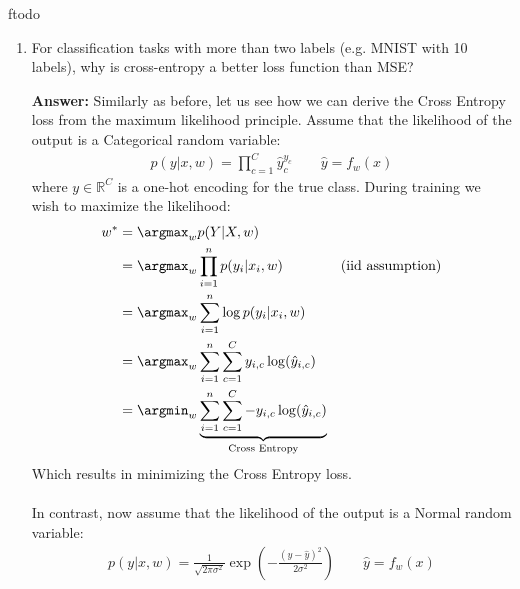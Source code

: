 ƒtodo\documentclass{article}
\newenvironment{QandA}{\begin{enumerate}[label=\arabic*.]}{\end{enumerate}}
\newenvironment{answer}{\par\normalfont \textbf{Answer:}}{}
\newcommand{\R}{\mathbb{R}}
\newcommand{\g}{\vert}
\begin{document}
\begin{QandA}
    \item For classification tasks with more than two labels (e.g. MNIST with 10 labels), why is cross-entropy a better loss function than MSE?
    \begin{answer}
        Similarly as before, let us see how we can derive the Cross Entropy loss from the maximum likelihood principle. Assume that the likelihood of the output is a Categorical random variable:
        \begin{align*}
            p(y \g x, w) = \prod_{c=1}^C \hat{y}_c^{y_c} \quad\quad \hat{y} = f_w(x)
        \end{align*}
        where $y \in \R^C$ is a one-hot encoding for the true class. During training we wish to maximize the likelihood:
        \begin{align*}
            w^* &= \argmax_{w} p(Y \g X, w) \\
            &= \argmax_{w} \prod_{i=1}^n p(y_i \g x_i, w) &\text{(iid assumption)} \\
            &= \argmax_{w} \sum_{i=1}^n \log p(y_i \g x_i, w) \\
            &= \argmax_{w} \sum_{i=1}^n \sum_{c=1}^C y_{i, c} \log (\hat{y}_{i, c}) \\
            &= \argmin_{w} \underbrace{\sum_{i=1}^n \sum_{c=1}^C - y_{i, c} \log (\hat{y}_{i, c})}_{\text{Cross Entropy}}
        \end{align*}
        Which results in minimizing the Cross Entropy loss. \\\\
        In contrast, now assume that the likelihood of the output is a Normal random variable:
        \begin{align*}
            p(y \g x, w) = \frac{1}{\sqrt{2\pi \sigma^2}} \exp \left ( -\frac{(y - \hat{y})^2}{2\sigma^2} \right) \quad \quad \hat{y} = f_w(x)
        \end{align*}
        

\end{answer}
\end{QandA}
\end{document}
